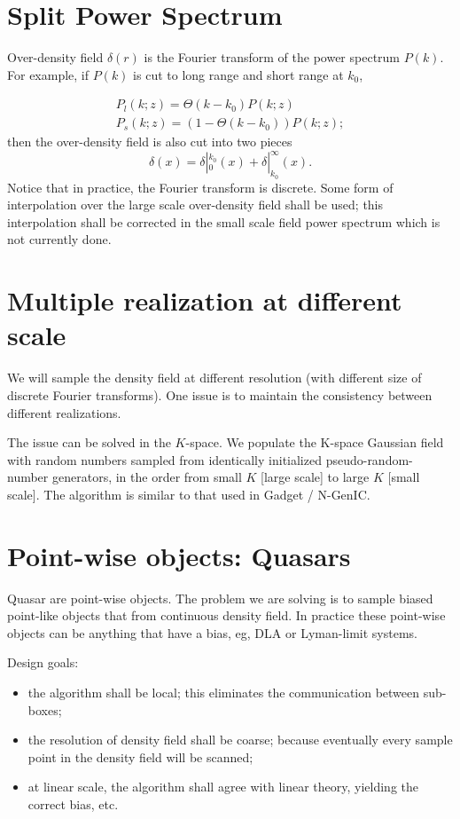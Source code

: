 \documentclass{paper}
\begin{document}
\section{Split Power Spectrum}
    Over-density field $\delta(r)$ is the Fourier transform of
    the power spectrum $P(k)$. For example, if $P(k)$ is cut to 
    long range and short range at $k_0$, 

    \begin{eqnarray*}
        P_l(k; z) = \Theta(k - k_0)P(k; z) \\
        P_s(k; z) = (1 - \Theta(k - k_0)) P(k; z);
    \end{eqnarray*}
    then the over-density field is also cut into two pieces
    \[
        \delta(x) = \delta|_{0}^{k_0}(x) +
        \delta|_{k_0}^{\infty}(x).
    \]
    Notice that in practice, the Fourier transform is discrete.
    Some form of interpolation over the large scale over-density field
    shall be used; this interpolation shall be corrected in the small scale
    field power spectrum which is not currently done.

\section{Multiple realization at different scale}
    We will sample the density field at different
    resolution (with different size of discrete Fourier transforms).    
    One issue is to maintain the consistency between different
    realizations. 

    The issue can be solved in the $K$-space.  We populate the K-space
    Gaussian field with random numbers sampled
    from identically initialized pseudo-random-number generators, in
    the order from small $K$ [large scale] to large $K$ [small scale].
    The algorithm is similar to that used in \small{Gadget}
    / \small{N-GenIC}.

\section{Point-wise objects: Quasars}
    Quasar are point-wise objects. The problem we are
    solving is to sample biased point-like objects that
    from continuous density field. In practice these
    point-wise objects can be anything that have a bias, eg, 
    DLA or Lyman-limit systems.

    Design goals:
    \begin{itemize}
        \item the algorithm shall be local; this eliminates the 
              communication between sub-boxes;
        \item the resolution of density field shall be coarse; 
              because eventually every sample point in the density
              field will be scanned;
        \item at linear scale, the algorithm shall agree
              with linear theory, yielding the correct bias,
              etc.
    \end{itemize}
\end{document}

